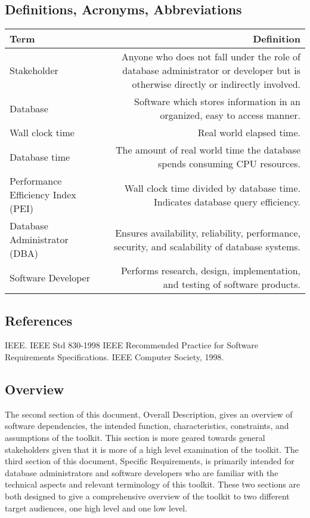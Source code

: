 \documentclass[draftclsnofoot, onecolumn, 10pt]{IEEEtran}
\begin{document}
\subsection{Definitions, Acronyms, Abbreviations}
\begin{center}
  \begin{tabular}{ | l | r | }
    \hline
    Term & Definition \\ \hline
    \hline
    Stakeholder & Anyone who does not fall under the role of database administrator or developer but is otherwise directly or indirectly involved. \\ \hline
    \hline
    Database & Software which stores information in an organized, easy to access manner. \\ \hline
    \hline
    Wall clock time & Real world elapsed time. \\ \hline
    \hline
    Database time & The amount of real world time the database spends consuming CPU resources. \\ \hline
    \hline
    Performance Efficiency Index (PEI) & Wall clock time divided by database time. Indicates database query efficiency. \\ \hline
    \hline
    Database Administrator (DBA) & Ensures availability, reliability, performance, security, and scalability of database systems. \\ \hline
    \hline
    Software Developer & Performs research, design, implementation, and testing of software products. \\ \hline    
  \end{tabular}
\end{center}

\subsection{References}
IEEE.   IEEE Std 830-1998 IEEE Recommended Practice for Software Requirements 
Specifications. IEEE Computer Society, 1998.

\subsection{Overview}
The second section of this document, Overall Description, gives an overview of software dependencies, the intended function, characteristics, constraints, and assumptions of the toolkit. This section is more geared towards general stakeholders given that it is more of a high level examination of the toolkit. The third section of this document, Specific Requirements, is primarily intended for database administrators and software developers who are familiar with the technical aspects and relevant terminology of this toolkit. These two sections are both designed to give a comprehensive overview of the toolkit to two different target audiences, one high level and one low level.
\end{document}
